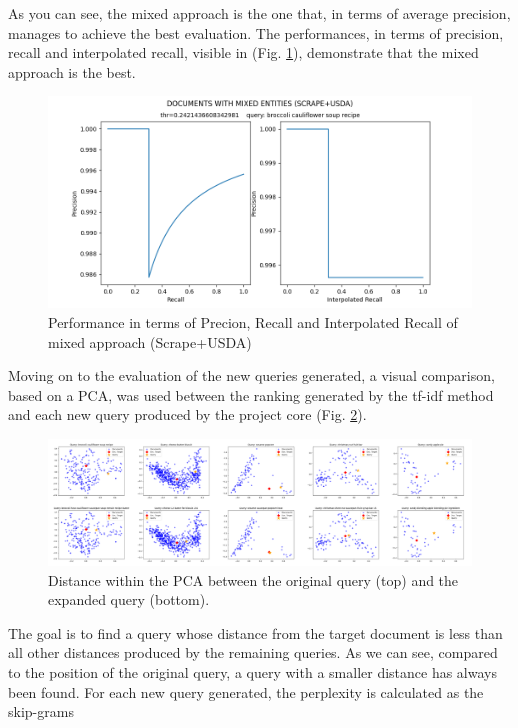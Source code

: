 As you can see, the mixed approach is the one that, in 
terms of average precision, manages to achieve the best evaluation. The 
performances, in terms of precision, recall and interpolated recall, visible in 
(Fig. \ref{Performance mixed approach}), demonstrate that the mixed approach is the best. 
\begin{figure}[h!]
    \centering
    \includegraphics[width =0.9\linewidth]{images/11 keras/11 DOCUMENTS WITH MIXED ENTITIES (SCRAPE+USDA).png}
    \centering
    \caption{Performance in terms of Precion, Recall and Interpolated Recall of mixed approach (Scrape+USDA)}
    \label{Performance mixed approach}
\end{figure}
Moving 
on to the evaluation of the new queries generated, a visual comparison, based 
on a PCA, was used between the ranking generated by the tf-idf method and 
each new query produced by the project core (Fig. \ref{PCA}). 
\begin{figure}[h!]
    \centering
    \includegraphics[width =\linewidth]{images/PCA paper/PCA all.png}
    \centering
    \caption{Distance within the PCA between the original query (top) and the expanded query (bottom).}
    \label{PCA}
\end{figure}
The goal is to find a query 
whose distance from the target document is less than all other distances 
produced by the remaining queries. As we can see, compared to the position 
of the original query, a query with a smaller distance has always been found.
For each new query generated, the perplexity is calculated as the skip-grams 
